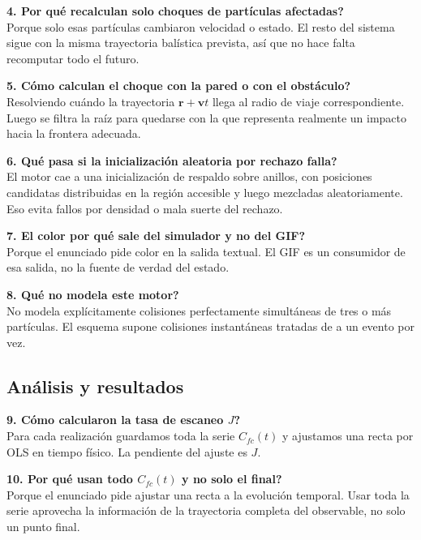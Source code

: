 \documentclass[11pt]{article}
\begin{document}
\textbf{4. \textquestiondown Por qu\'e recalculan solo choques de part\'iculas afectadas?}\\
Porque solo esas part\'iculas cambiaron velocidad o estado. El resto del sistema sigue con la misma trayectoria bal\'istica prevista, as\'i que no hace falta recomputar todo el futuro.

\textbf{5. \textquestiondown C\'omo calculan el choque con la pared o con el obst\'aculo?}\\
Resolviendo cu\'ando la trayectoria $\bm r + \bm v t$ llega al radio de viaje correspondiente. Luego se filtra la ra\'iz para quedarse con la que representa realmente un impacto hacia la frontera adecuada.

\textbf{6. \textquestiondown Qu\'e pasa si la inicializaci\'on aleatoria por rechazo falla?}\\
El motor cae a una inicializaci\'on de respaldo sobre anillos, con posiciones candidatas distribuidas en la regi\'on accesible y luego mezcladas aleatoriamente. Eso evita fallos por densidad o mala suerte del rechazo.

\textbf{7. \textquestiondown El color por qu\'e sale del simulador y no del GIF?}\\
Porque el enunciado pide color en la salida textual. El GIF es un consumidor de esa salida, no la fuente de verdad del estado.

\textbf{8. \textquestiondown Qu\'e no modela este motor?}\\
No modela expl\'icitamente colisiones perfectamente simult\'aneas de tres o m\'as part\'iculas. El esquema supone colisiones instant\'aneas tratadas de a un evento por vez.

\subsection{An\'alisis y resultados}

\textbf{9. \textquestiondown C\'omo calcularon la tasa de escaneo $J$?}\\
Para cada realizaci\'on guardamos toda la serie $C_{fc}(t)$ y ajustamos una recta por OLS en tiempo f\'isico. La pendiente del ajuste es $J$.

\textbf{10. \textquestiondown Por qu\'e usan todo $C_{fc}(t)$ y no solo el final?}\\
Porque el enunciado pide ajustar una recta a la evoluci\'on temporal. Usar toda la serie aprovecha la informaci\'on de la trayectoria completa del observable, no solo un punto final.
\end{document}

